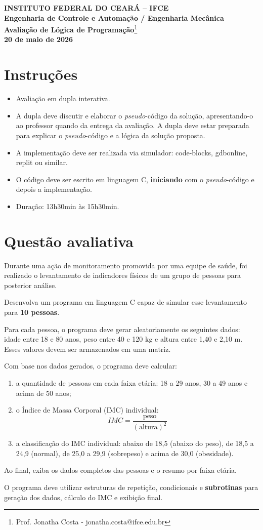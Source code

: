 \documentclass[11pt]{article}
\begin{document}
	
	\begin{center}
		\textbf{\large INSTITUTO FEDERAL DO CEARÁ – IFCE}\\
		\textbf{Engenharia de Controle e Automação / Engenharia Mecânica}\\
		\textbf{Avaliação de Lógica de Programação}\footnote{Prof. Jonatha Costa - jonatha.costa@ifce.edu.br}\\
		\textbf{20 de maio de 2026}
	\end{center}
	
	\section*{Instruções}
	
	\begin{itemize}
		\item Avaliação em dupla interativa.
		\item A dupla deve discutir e elaborar o \textit{pseudo}-código da solução, apresentando-o ao professor quando da entrega da avaliação. 
        A dupla deve estar preparada para explicar o \textit{pseudo}-código e a lógica da solução proposta.
        \item A implementação deve ser realizada via simulador: code-blocks, gdbonline, replit ou similar.
        \item O código deve ser escrito em linguagem C, \textbf{iniciando} com o \textit{pseudo}-código e depois a implementação.
		\item Duração: 13h30min às 15h30min.
	\end{itemize}
	
	\section*{Questão avaliativa}

Durante uma ação de monitoramento promovida por uma equipe de saúde, foi realizado o levantamento de indicadores físicos de um grupo de pessoas para posterior análise.

Desenvolva um programa em linguagem C capaz de simular esse levantamento para \textbf{10 pessoas}.

Para cada pessoa, o programa deve gerar aleatoriamente os seguintes dados: idade entre 18 e 80 anos, peso entre 40 e 120 kg e altura entre 1,40 e 2,10 m. Esses valores devem ser armazenados em uma matriz.

Com base nos dados gerados, o programa deve calcular:

\begin{enumerate}[label=\alph*)]
    \item a quantidade de pessoas em cada faixa etária: 18 a 29 anos, 30 a 49 anos e acima de 50 anos;
    
    \item o Índice de Massa Corporal (IMC) individual:
    \[
        IMC = \frac{\text{peso}}{(\text{altura})^2}
    \]
    
    \item a classificação do IMC individual:
    abaixo de 18,5 (abaixo do peso), de 18,5 a 24,9 (normal), de 25,0 a 29,9 (sobrepeso) e acima de 30,0 (obesidade).
\end{enumerate}

Ao final, exiba os dados completos das pessoas e o resumo por faixa etária.

O programa deve utilizar estruturas de repetição, condicionais e \textbf{subrotinas} para geração dos dados, cálculo do IMC e exibição final.
\end{document}
